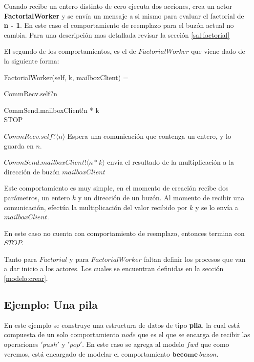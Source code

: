 Cuando recibe un entero distinto de cero ejecuta dos acciones, crea un actor \textbf{FactorialWorker} y se envía un mensaje a si mismo para evaluar el factorial de \textbf{n - 1}. En este caso el comportamiento de reemplazo para el buzón actual no cambia. Para una descripción mas detallada revisar la sección \ref{sal:factorial}

El segundo de los comportamientos, es el de $FactorialWorker$ que viene dado de la siguiente forma:

\begin{process}
FactorialWorker(self, k, mailboxClient) = {} \\ \quad
  \begin{block}
  CommRecv.self?\langle n \rangle \then {} \\ \quad
    \begin{block}
    CommSend.mailboxClient!\langle n * k \rangle \then \\
    STOP
    \end{block}
  \end{block}
\end{process}

\begin{description}
 \item $CommRecv.self?\langle n \rangle$ Espera una comunicación que contenga un entero, y lo guarda en $n$.
 \item $CommSend.mailboxClient!\langle n * k \rangle$ envía el resultado de la multiplicación a la dirección de buzón $mailboxClient$
\end{description}

Este comportamiento es muy simple, en el momento de creación recibe dos parámetros, un entero $k$ y un dirección de un buzón. Al momento de recibir una comunicación, efectúa la multiplicación del valor recibido por $k$ y se lo envía a $mailboxClient$.

En este caso no cuenta con comportamiento de reemplazo, entonces termina con $STOP$.

Tanto para $Factorial$ y para $FactorialWorker$ faltan definir los procesos que van a dar inicio a los actores. Los cuales se encuentran definidas en la sección \ref{modelo:crear}. 

\subsection{Ejemplo: Una pila}
En este ejemplo se construye una estructura de datos de tipo \textbf{pila}, la cual está compuesta de un solo comportamiento $node$ que es el que se encarga de recibir las operaciones $'push'$ y $'pop'$. En este caso se agrega al modelo $fwd$ que como veremos, está encargado de modelar el comportamiento $\textbf{become}\ buzon$.

